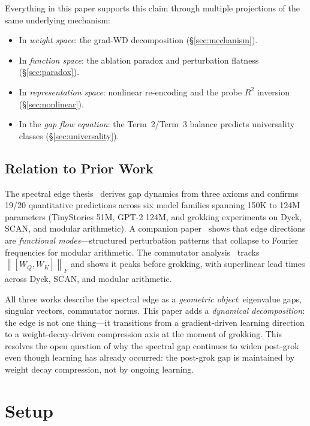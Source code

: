 \documentclass[11pt]{article}
\newcommand{\norm}[1]{\left\|#1\right\|}
\begin{document}
\noindent
Everything in this paper supports this claim through multiple projections of the same underlying mechanism:
\begin{itemize}[nosep]
    \item In \emph{weight space}: the grad-WD decomposition (\S\ref{sec:mechanism}).
    \item In \emph{function space}: the ablation paradox and perturbation flatness (\S\ref{sec:paradox}).
    \item In \emph{representation space}: nonlinear re-encoding and the probe $R^2$ inversion (\S\ref{sec:nonlinear}).
    \item In the \emph{gap flow equation}: the Term~2/Term~3 balance predicts universality classes (\S\ref{sec:universality}).
\end{itemize}

\subsection{Relation to Prior Work}

The spectral edge thesis~\citep{xu2026spectral_edge} derives gap dynamics from three axioms and confirms 19/20 quantitative predictions across six model families spanning 150K to 124M parameters (TinyStories 51M, GPT-2 124M, and grokking experiments on Dyck, SCAN, and modular arithmetic).
A companion paper~\citep{xu2026functional_modes} shows that edge directions are \emph{functional modes}---structured perturbation patterns that collapse to Fourier frequencies for modular arithmetic.
The commutator analysis~\citep{xu2026commutator, xu2026transverse} tracks $\norm{[W_Q, W_K]}_F$ and shows it peaks before grokking, with superlinear lead times across Dyck, SCAN, and modular arithmetic.

All three works describe the spectral edge as a \emph{geometric object}: eigenvalue gaps, singular vectors, commutator norms.
This paper adds a \emph{dynamical decomposition}: the edge is not one thing---it transitions from a gradient-driven learning direction to a weight-decay-driven compression axis at the moment of grokking.
This resolves the open question of why the spectral gap continues to widen post-grok even though learning has already occurred: the post-grok gap is maintained by weight decay compression, not by ongoing learning.


\section{Setup}
\label{sec:setup}
\end{document}
